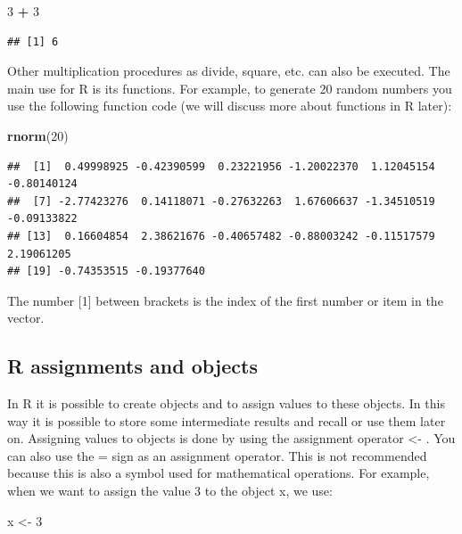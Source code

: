 \documentclass[
]{book}
\newenvironment{Shaded}{\begin{snugshade}}{\end{snugshade}}
\newcommand{\DecValTok}[1]{\textcolor[rgb]{0.00,0.00,0.81}{#1}}
\newcommand{\KeywordTok}[1]{\textcolor[rgb]{0.13,0.29,0.53}{\textbf{#1}}}
\newcommand{\NormalTok}[1]{#1}
\newcommand{\OperatorTok}[1]{\textcolor[rgb]{0.81,0.36,0.00}{\textbf{#1}}}
\newcommand{\StringTok}[1]{\textcolor[rgb]{0.31,0.60,0.02}{#1}}
\begin{document}
\begin{Shaded}
\begin{Highlighting}[]
\DecValTok{3} \OperatorTok{+}\StringTok{ }\DecValTok{3}
\end{Highlighting}
\end{Shaded}

\begin{verbatim}
## [1] 6
\end{verbatim}

Other multiplication procedures as divide, square, etc. can also be executed. The main use for R is its functions. For example, to generate 20 random numbers you use the following function code (we will discuss more about functions in R later):

\begin{Shaded}
\begin{Highlighting}[]
\KeywordTok{rnorm}\NormalTok{(}\DecValTok{20}\NormalTok{)}
\end{Highlighting}
\end{Shaded}

\begin{verbatim}
##  [1]  0.49998925 -0.42390599  0.23221956 -1.20022370  1.12045154 -0.80140124
##  [7] -2.77423276  0.14118071 -0.27632263  1.67606637 -1.34510519 -0.09133822
## [13]  0.16604854  2.38621676 -0.40657482 -0.88003242 -0.11517579  2.19061205
## [19] -0.74353515 -0.19377640
\end{verbatim}

The number {[}1{]} between brackets is the index of the first number or item in the vector.

\hypertarget{r-assignments-and-objects}{%
\subsection{R assignments and objects}\label{r-assignments-and-objects}}

In R it is possible to create objects and to assign values to these objects. In this way it is possible to store some intermediate results and recall or use them later on. Assigning values to objects is done by using the assignment operator \textless- . You can also use the = sign as an assignment operator. This is not recommended because this is also a symbol used for mathematical operations. For example, when we want to assign the value 3 to the object x, we use:

\begin{Shaded}
\begin{Highlighting}[]
\NormalTok{x <-}\StringTok{ }\DecValTok{3} 
\end{Highlighting}
\end{Shaded}
\end{document}
